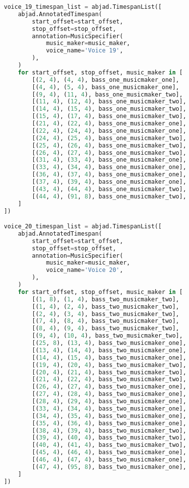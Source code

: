 \begin{lstlisting}[language=Python, caption=Invocation Source Code]
voice_19_timespan_list = abjad.TimespanList([
    abjad.AnnotatedTimespan(
        start_offset=start_offset,
        stop_offset=stop_offset,
        annotation=MusicSpecifier(
            music_maker=music_maker,
            voice_name='Voice 19',
        ),
    )
    for start_offset, stop_offset, music_maker in [
        [(2, 4), (4, 4), bass_one_musicmaker_one],
        [(4, 4), (5, 4), bass_one_musicmaker_one],
        [(9, 4), (11, 4), bass_one_musicmaker_two],
        [(11, 4), (12, 4), bass_one_musicmaker_two],
        [(14, 4), (15, 4), bass_one_musicmaker_two],
        [(15, 4), (17, 4), bass_one_musicmaker_two],
        [(21, 4), (22, 4), bass_one_musicmaker_one],
        [(22, 4), (24, 4), bass_one_musicmaker_one],
        [(24, 4), (25, 4), bass_one_musicmaker_two],
        [(25, 4), (26, 4), bass_one_musicmaker_two],
        [(26, 4), (27, 4), bass_one_musicmaker_two],
        [(31, 4), (33, 4), bass_one_musicmaker_one],
        [(33, 4), (34, 4), bass_one_musicmaker_one],
        [(36, 4), (37, 4), bass_one_musicmaker_one],
        [(37, 4), (39, 4), bass_one_musicmaker_one],
        [(43, 4), (44, 4), bass_one_musicmaker_two],
        [(44, 4), (91, 8), bass_one_musicmaker_two],
    ]
])

voice_20_timespan_list = abjad.TimespanList([
    abjad.AnnotatedTimespan(
        start_offset=start_offset,
        stop_offset=stop_offset,
        annotation=MusicSpecifier(
            music_maker=music_maker,
            voice_name='Voice 20',
        ),
    )
    for start_offset, stop_offset, music_maker in [
        [(1, 8), (1, 4), bass_two_musicmaker_two],
        [(1, 4), (2, 4), bass_two_musicmaker_two],
        [(2, 4), (3, 4), bass_two_musicmaker_two],
        [(7, 4), (8, 4), bass_two_musicmaker_two],
        [(8, 4), (9, 4), bass_two_musicmaker_two],
        [(9, 4), (10, 4), bass_two_musicmaker_two],
        [(25, 8), (13, 4), bass_two_musicmaker_one],
        [(13, 4), (14, 4), bass_two_musicmaker_one],
        [(14, 4), (15, 4), bass_two_musicmaker_one],
        [(19, 4), (20, 4), bass_two_musicmaker_two],
        [(20, 4), (21, 4), bass_two_musicmaker_two],
        [(21, 4), (22, 4), bass_two_musicmaker_two],
        [(26, 4), (27, 4), bass_two_musicmaker_one],
        [(27, 4), (28, 4), bass_two_musicmaker_one],
        [(28, 4), (29, 4), bass_two_musicmaker_one],
        [(33, 4), (34, 4), bass_two_musicmaker_one],
        [(34, 4), (35, 4), bass_two_musicmaker_one],
        [(35, 4), (36, 4), bass_two_musicmaker_one],
        [(38, 4), (39, 4), bass_two_musicmaker_two],
        [(39, 4), (40, 4), bass_two_musicmaker_two],
        [(40, 4), (41, 4), bass_two_musicmaker_two],
        [(45, 4), (46, 4), bass_two_musicmaker_one],
        [(46, 4), (47, 4), bass_two_musicmaker_one],
        [(47, 4), (95, 8), bass_two_musicmaker_one],
    ]
])


\end{lstlisting}
